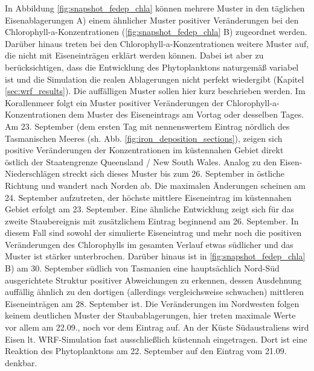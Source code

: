 \documentclass[12pt,a4paper,onecolumn,headheight=30pt]{scrartcl}
\begin{document}
In Abbildung \ref{fig:snapshot_fedep_chla} können mehrere Muster in den täglichen Eisenablagerungen A) einem ähnlicher Muster positiver Veränderungen bei den Chlorophyll-a-Konzentrationen (\ref{fig:snapshot_fedep_chla} B) zugeordnet werden. Darüber hinaus treten bei den Chlorophyll-a-Konzentrationen weitere Muster auf, die nicht mit Eiseneinträgen erklärt werden können. Dabei ist aber zu berücksichtigen, dass die Entwicklung des Phytoplanktons naturgemäß variabel ist und die Simulation die realen Ablagerungen nicht perfekt wiedergibt (Kapitel \ref{sec:wrf_results}). Die auffälligen Muster sollen hier kurz beschrieben werden. Im Korallenmeer folgt ein Muster positiver Veränderungen der Chlorophyll-a-Konzentrationen dem Muster des Eiseneintrags am Vortag oder desselben Tages. Am 23. September (dem ersten Tag mit nennenswertem Eintrag nördlich des Tasmanischen Meeres (sh. Abb. \ref{fig:iron_deposition_sections}), zeigen sich positive Veränderungen der Konzentrationen im küstennahen Gebiet direkt östlich der Staatengrenze Queensland / New South Wales. Analog zu den Eisen-Niederschlägen streckt sich dieses Muster bis zum 26. September in östliche Richtung und wandert nach Norden ab. Die maximalen Änderungen scheinen am 24. September aufzutreten, der höchste mittlere Eiseneintrag im küstennahen Gebiet erfolgt am 23. September. Eine ähnliche Entwicklung zeigt sich für das  zweite Staubereignis mit zusätzlichem Eintrag beginnend am 26. September. In diesem Fall sind sowohl der simulierte Eiseneintrag und mehr noch die positiven Veränderungen des Chlorophylls im gesamten Verlauf etwas südlicher und das Muster ist stärker unterbrochen. Darüber hinaus ist in \ref{fig:snapshot_fedep_chla} B) am 30. September südlich von Tasmanien eine hauptsächlich Nord-Süd ausgerichtete Struktur positiver Abweichungen zu erkennen, dessen Ausdehnung auffällig ähnlich zu den dortigen (allerdings vergleichsweise schwachen) mittleren Eiseneinträgen am 28. September ist. Die Veränderungen im Nordwesten folgen keinem deutlichen Muster der Staubablagerungen, hier treten maximale Werte vor allem am 22.09., noch vor dem Eintrag auf. An der Küste Südaustraliens wird Eisen lt. WRF-Simulation fast ausschließlich küstennah eingetragen. Dort ist eine Reaktion des Phytoplanktons am 22. September auf den Eintrag vom 21.09. denkbar. \linebreak
\end{document}
